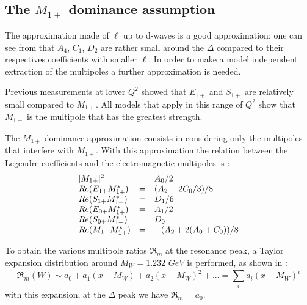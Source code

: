 \subsection{The $M_{1+}$ dominance assumption}
The approximation made  of $\ell$ up to d-waves
is a good approximation: one can see from 
that $A_4$, $C_1$, $D_2$ are rather small around the $\Delta$ compared to their
respectives coefficients with smaller $\ell$.
In order to make a model independent extraction of the multipoles a further approximation is needed.


Previous measurements at lower $Q^2$ showed that $E_{1+}$ and $S_{1+}$ are relatively small compared
to $M_{1+}$. All models that apply in this range of $Q^2$ show 
that $M_{1+}$ is the multipole that has the greatest strength.

The $M_{1+}$ dominance approximation consists in considering only  the multipoles
that interfere with $M_{1+}$.
With this approximation the relation between the Legendre coefficients and the electromagnetic multipoles
is \cite{bib:raskin}:
\begin{equation}
\begin{array}{l c l}
| M_{1+} |^2 & = & A_0/2 \\
Re(E_{1+}M_{1+}^*) & = & (A_2 - 2C_0/3)/8 \\
Re(S_{1+}M_{1+}^*) & = & D_1/6 \\
Re(E_{0+}M_{1+}^*) & = & A_1/2 \\
Re(S_{0+}M_{1+}^*) & = & D_0 \\
Re(M_{1-}M_{1+}^*) & = & -(A_2+2(A_0+C_0))/8 \\
\end{array}
\label{eqno:m1dominance}
\end{equation}

To obtain the various multipole ratios $\Re_{m}$ at the resonance peak, a Taylor expansion 
distribution around $M_W = 1.232$ $GeV$ is performed, as shown in  :
$$
\Re_{m} (W) \sim a_0 + a_1(x-M_W) + a_2(x-M_W)^2 + ...  = \sum_{i}a_i(x-M_W)^i
$$
with this expansion, at the $\Delta $ peak we have $\Re_{m} = a_0$.

